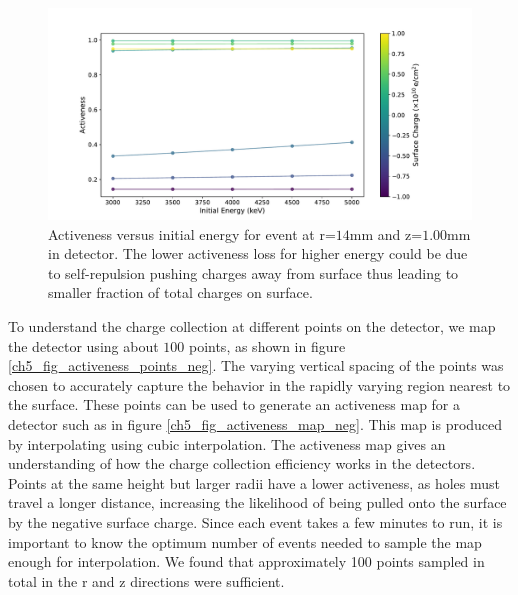 \begin{figure}%
\centering
\includegraphics[trim={2cm 0cm 3cm 0cm},clip,width=0.99\linewidth]{ch5/figs/activness_vs_eng.pdf}
\caption{Activeness versus initial energy for event at r=$14$mm and z=$1.00$mm in {\ponama} detector. The lower activeness loss for higher energy could be due to self-repulsion pushing charges away from surface thus leading to smaller fraction of total charges on surface.}
\label{ch5_fig_act_eng}
\end{figure}

To understand the charge collection at different points on the detector, we map the detector using about $100$ points, as shown in figure \ref{ch5_fig_activeness_points_neg}. The varying vertical spacing of the points was chosen to accurately capture the behavior in the rapidly varying region nearest to the surface. These points can be used to generate an activeness map for a detector such as in figure \ref{ch5_fig_activeness_map_neg}. This map is produced by interpolating using cubic interpolation. The activeness map gives an understanding of how the charge collection efficiency works in the detectors. Points at the same height but larger radii have a lower activeness, as holes must travel a longer distance, increasing the likelihood of being pulled onto the surface by the negative surface charge. Since each event takes a few minutes to run, it is important to know the optimum number of events needed to sample the map enough for interpolation. We found that approximately 100 points sampled in total in the r and z directions were sufficient.

